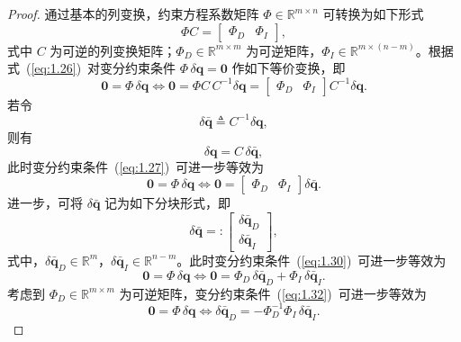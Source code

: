 \begin{proof}
通过基本的列变换，约束方程系数矩阵 $\Phi \in \mathbb{R}^{m \times n}$ 可转换为如下形式
\begin{equation}\label{eq:1.26}
\Phi C = \begin{bmatrix} \Phi_D & \Phi_I \end{bmatrix},
\end{equation}
式中 $C$ 为可逆的列变换矩阵；$\Phi_D \in \mathbb{R}^{m \times m}$ 为可逆矩阵，$\Phi_I \in \mathbb{R}^{m \times (n-m)}$。根据式~(\ref{eq:1.26})~对变分约束条件 $\Phi\,\delta\boldsymbol{q} = \boldsymbol{0}$ 作如下等价变换，即
\begin{equation}\label{eq:1.27}
\boldsymbol{0} = \Phi\,\delta\boldsymbol{q} \iff \boldsymbol{0} = \Phi C\, C^{-1} \delta\boldsymbol{q} = \begin{bmatrix} \Phi_D & \Phi_I \end{bmatrix} C^{-1} \delta\boldsymbol{q}.
\end{equation}
若令
\begin{equation}\label{eq:1.28}
\delta\bar{\boldsymbol{q}} \triangleq C^{-1} \delta\boldsymbol{q},
\end{equation}
则有
\begin{equation}\label{eq:1.29}
\delta\boldsymbol{q} = C\,\delta\bar{\boldsymbol{q}},
\end{equation}
此时变分约束条件~(\ref{eq:1.27})~可进一步等效为
\begin{equation}\label{eq:1.30}
\boldsymbol{0} = \Phi\,\delta\boldsymbol{q} \iff \boldsymbol{0} = \begin{bmatrix} \Phi_D & \Phi_I \end{bmatrix} \delta\bar{\boldsymbol{q}}.
\end{equation}
进一步，可将 $\delta\bar{\boldsymbol{q}}$ 记为如下分块形式，即
\begin{equation}\label{eq:1.31}
\delta\bar{\boldsymbol{q}} =: \begin{bmatrix} \delta\bar{\boldsymbol{q}}_D \\ \delta\bar{\boldsymbol{q}}_I \end{bmatrix},
\end{equation}
式中，$\delta\bar{\boldsymbol{q}}_D \in \mathbb{R}^m$，$\delta\bar{\boldsymbol{q}}_I \in \mathbb{R}^{n-m}$。此时变分约束条件~(\ref{eq:1.30})~可进一步等效为
\begin{equation}\label{eq:1.32}
\boldsymbol{0} = \Phi\,\delta\boldsymbol{q} \iff \boldsymbol{0} = \Phi_D \,\delta\bar{\boldsymbol{q}}_D + \Phi_I \,\delta\bar{\boldsymbol{q}}_I.
\end{equation}
考虑到 $\Phi_D \in \mathbb{R}^{m \times m}$ 为可逆矩阵，变分约束条件~(\ref{eq:1.32})~可进一步等效为
\begin{equation}\label{eq:1.33}
\boldsymbol{0} = \Phi\,\delta\boldsymbol{q} \iff \delta\bar{\boldsymbol{q}}_D = -\Phi_D^{-1} \Phi_I \,\delta\bar{\boldsymbol{q}}_I.
\end{equation}


\end{proof}
